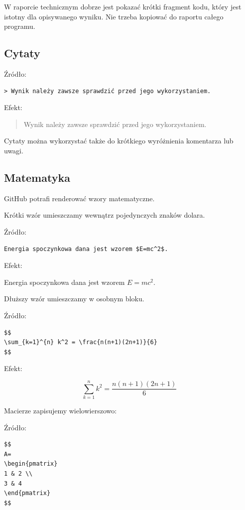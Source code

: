 \documentclass[12pt,a4paper]{article}
\begin{document}
W raporcie technicznym dobrze jest pokazać krótki fragment kodu, który jest istotny dla opisywanego wyniku. Nie trzeba kopiować do raportu całego programu.

\subsection{Cytaty}

Źródło:

\begin{lstlisting}
> Wynik należy zawsze sprawdzić przed jego wykorzystaniem.
\end{lstlisting}

Efekt:

\begin{quote}
Wynik należy zawsze sprawdzić przed jego wykorzystaniem.
\end{quote}

Cytaty można wykorzystać także do krótkiego wyróżnienia komentarza lub uwagi.

\subsection{Matematyka}

GitHub potrafi renderować wzory matematyczne.

Krótki wzór umieszczamy wewnątrz pojedynczych znaków dolara.

Źródło:

\begin{lstlisting}
Energia spoczynkowa dana jest wzorem $E=mc^2$.
\end{lstlisting}

Efekt:

Energia spoczynkowa dana jest wzorem \(E=mc^2\).

Dłuższy wzór umieszczamy w osobnym bloku.

Źródło:

\begin{lstlisting}
$$
\sum_{k=1}^{n} k^2 = \frac{n(n+1)(2n+1)}{6}
$$
\end{lstlisting}

Efekt:

\[
\sum_{k=1}^{n} k^2 =
\frac{n(n+1)(2n+1)}{6}
\]

Macierze zapisujemy wielowierszowo:

Źródło:

\begin{lstlisting}
$$
A=
\begin{pmatrix}
1 & 2 \\
3 & 4
\end{pmatrix}
$$
\end{lstlisting}
\end{document}

